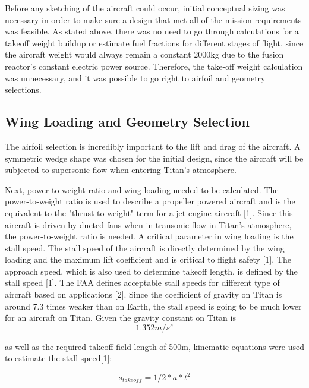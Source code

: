 \documentclass{article}
\begin{document}
Before any sketching of the aircraft could occur, initial conceptual sizing was necessary in order to make sure a design that met all of the mission requirements was feasible. As stated above, there was no need to go through calculations for a takeoff weight buildup or estimate fuel fractions for different stages of flight, since the aircraft weight would always remain a constant 2000kg due to the fusion reactor's constant electric power source. Therefore, the take-off weight calculation was unnecessary, and it was possible to go right to airfoil and geometry selections. 

\subsection{Wing Loading and Geometry Selection} 
\label{sec: Wing Loading and Geometry Selection} 

The airfoil selection is incredibly important to the lift and drag of the aircraft. A symmetric wedge shape was chosen for the initial design, since the aircraft will be subjected to supersonic flow when entering Titan's atmosphere. 


Next, power-to-weight ratio and wing loading needed to be calculated. The power-to-weight ratio is used to describe a propeller powered aircraft and is the equivalent to the "thrust-to-weight" term for a jet engine aircraft [1]. Since this aircraft is driven by ducted fans when in transonic flow in Titan's atmosphere, the power-to-weight ratio is needed.  A critical parameter in wing loading is the stall speed. The stall speed of the aircraft is directly determined by the wing loading and the maximum lift coefficient and is critical to flight safety [1]. The approach speed, which is also used to determine takeoff length, is defined by the stall speed [1]. The FAA defines acceptable stall speeds for different type of aircraft based on applications [2]. Since the coefficient of gravity on Titan is around 7.3 times weaker than on Earth, the stall speed is going to be much lower for an aircraft on Titan. Given the gravity constant on Titan is 
\begin{equation} 
1.352 m/s^{s}
\end {equation}

as well as the required takeoff field length of 500m, kinematic equations were used to estimate the stall speed[1]: 

\begin{equation}
s_{takeoff} = 1/2*a*t^{2} 
 \label{eq: kinematic distance}
\end {equation} 
\end{document}
